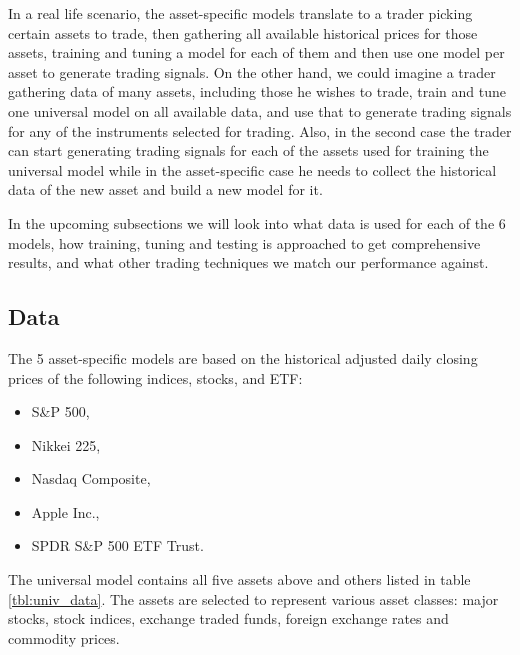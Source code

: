 \documentclass[11pt, a4paper]{article}
\begin{document}
In a real life scenario, the asset-specific models translate to a trader picking certain assets to trade, then gathering all available historical prices for those assets, training and tuning a model for each of them and then use one model per asset to generate trading signals. 
On the other hand, we could imagine a trader gathering data of many assets, including those he wishes to trade, train and tune one universal model on all available data, and use that to generate trading signals for any of the instruments selected for trading. Also, in the second case the trader can start generating trading signals for each of the assets used for training the universal model while in the asset-specific case he needs to collect the historical data of the new asset and build a new model for it.

In the upcoming subsections we will look into what data is used for each of the 6 models, how training, tuning and testing is approached to get comprehensive results, and what other trading techniques we match our performance against.

\label{sec:DM}
\subsection{Data}
\label{subsec:DM:Data}

The 5 asset-specific models are based on the historical adjusted daily closing prices of the following indices, stocks, and ETF:

\begin{itemize}
    \item S\&P 500,
    \item Nikkei 225,
    \item Nasdaq Composite,
    \item Apple Inc.,
    \item SPDR S\&P 500 ETF Trust.
\end{itemize} 

The universal model contains all five assets above and others listed in table \ref{tbl:univ_data}. The assets are selected to represent various asset classes: major stocks, stock indices, exchange traded funds, foreign exchange rates and commodity prices.
\end{document}
